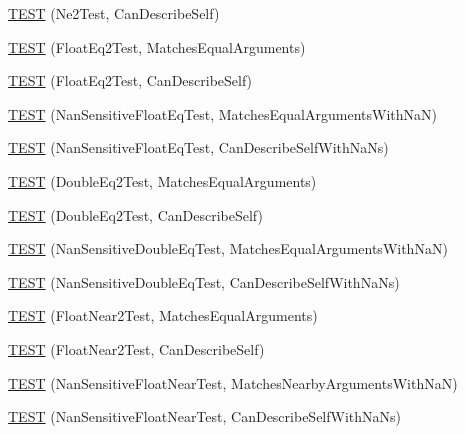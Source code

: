 \begin{DoxyCompactItemize}
\item 
\mbox{\hyperlink{namespacetesting_1_1gmock__matchers__test_acedf2eda13385067ee70bdb7d6073427}{T\+E\+ST}} (Ne2\+Test, Can\+Describe\+Self)
\item 
\mbox{\hyperlink{namespacetesting_1_1gmock__matchers__test_a8c6f403990cc0fccf8450efee1c15002}{T\+E\+ST}} (Float\+Eq2\+Test, Matches\+Equal\+Arguments)
\item 
\mbox{\hyperlink{namespacetesting_1_1gmock__matchers__test_ad19d6e110e85c3e7883d07f50a4b2708}{T\+E\+ST}} (Float\+Eq2\+Test, Can\+Describe\+Self)
\item 
\mbox{\hyperlink{namespacetesting_1_1gmock__matchers__test_ae79a1197b9700a9c3299d5d6773bae60}{T\+E\+ST}} (Nan\+Sensitive\+Float\+Eq\+Test, Matches\+Equal\+Arguments\+With\+NaN)
\item 
\mbox{\hyperlink{namespacetesting_1_1gmock__matchers__test_acb2db40a51cacb3640e9e53550f22a05}{T\+E\+ST}} (Nan\+Sensitive\+Float\+Eq\+Test, Can\+Describe\+Self\+With\+Na\+Ns)
\item 
\mbox{\hyperlink{namespacetesting_1_1gmock__matchers__test_ac5d042ac79e58a41118a7c025df84265}{T\+E\+ST}} (Double\+Eq2\+Test, Matches\+Equal\+Arguments)
\item 
\mbox{\hyperlink{namespacetesting_1_1gmock__matchers__test_aca0555b5646f5553e131d98fd311bde6}{T\+E\+ST}} (Double\+Eq2\+Test, Can\+Describe\+Self)
\item 
\mbox{\hyperlink{namespacetesting_1_1gmock__matchers__test_ac3c08325efc35d2ce3a779082e133c68}{T\+E\+ST}} (Nan\+Sensitive\+Double\+Eq\+Test, Matches\+Equal\+Arguments\+With\+NaN)
\item 
\mbox{\hyperlink{namespacetesting_1_1gmock__matchers__test_a7f3c0b8340e424a6a41f7a0a00072791}{T\+E\+ST}} (Nan\+Sensitive\+Double\+Eq\+Test, Can\+Describe\+Self\+With\+Na\+Ns)
\item 
\mbox{\hyperlink{namespacetesting_1_1gmock__matchers__test_aff4b9c79cf64ea0348be61ced3fdf1d2}{T\+E\+ST}} (Float\+Near2\+Test, Matches\+Equal\+Arguments)
\item 
\mbox{\hyperlink{namespacetesting_1_1gmock__matchers__test_af9cf6709254ef2df314b8989abd0327f}{T\+E\+ST}} (Float\+Near2\+Test, Can\+Describe\+Self)
\item 
\mbox{\hyperlink{namespacetesting_1_1gmock__matchers__test_a120a3f5e18772202f60c2b32ae0bc6b3}{T\+E\+ST}} (Nan\+Sensitive\+Float\+Near\+Test, Matches\+Nearby\+Arguments\+With\+NaN)
\item 
\mbox{\hyperlink{namespacetesting_1_1gmock__matchers__test_a7d029a5d7ca6bc503227f7c34a5e20e2}{T\+E\+ST}} (Nan\+Sensitive\+Float\+Near\+Test, Can\+Describe\+Self\+With\+Na\+Ns)

\end{DoxyCompactItemize}
